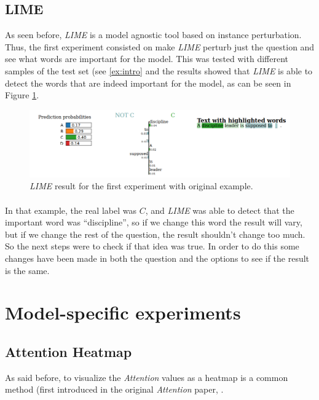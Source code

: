\subsection{LIME}
\label{sec:LIMEResults}
\noindent As seen before, \emph{LIME} is a model agnostic tool based on instance perturbation. Thus, the first experiment consisted on make \emph{LIME} perturb just the question and see what words are important for the model. This was tested with different samples of the test set (see \ref{ex:intro} and the results showed that \emph{LIME} is able to detect the words that are indeed important for the model, as can be seen in Figure \ref{fig:lime-result-q-1a}.
\begin{figure}[!h]
	\centering
	\includegraphics[scale=0.35]{images/lime-result-q-1a}
	\caption{\emph{LIME} result for the first experiment with original example.}
	\label{fig:lime-result-q-1a}
\end{figure}
\paragraph{}
In that example, the real label was $C$, and \emph{LIME} was able to detect that the important word was ``discipline'', so if we change this word the result will vary, but if we change the rest of the question, the result shouldn't change too much. 
So the next steps were to check if that idea was true. In order to do this some changes have been made in both the question and the options to see if the result is the same.
\paragraph{}

\section{Model-specific experiments}
\label{sec:ModelSpecificExperiments}
\noindent 
\subsection{Attention Heatmap}
\label{sec:AttentionHeatmapResults}
\noindent As said before, to visualize the \emph{Attention} values as a heatmap is a common method (first introduced in the original \emph{Attention} paper, \cite{Bahdanau2014}. 
